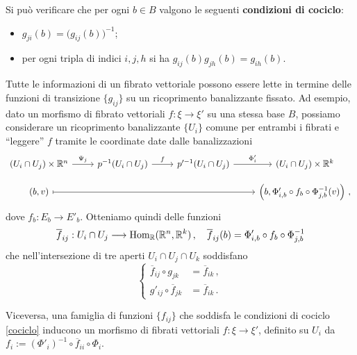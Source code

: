\begin{oss}
	Si può verificare che per ogni $b \in B$
	valgono le seguenti \textbf{condizioni di cociclo}:
	\begin{itemize}
		\item $g_{ji}(b) = \big( g_{ij}(b) \big)^{-1}$;
		\item per ogni tripla di indici $i,j,h$ si ha $g_{ij}(b) g_{jh}(b) = g_{ih}(b)$. 
	\end{itemize}
	Tutte le informazioni di un fibrato vettoriale possono essere 
	lette in termine delle funzioni di transizione $\{g_{ij}\}$ su
	un ricoprimento banalizzante fissato. Ad esempio,
	dato un morfismo di fibrato vettoriali $f: \xi \to \xi'$ su una stessa base $B$,
	possiamo considerare un ricoprimento banalizzante $\{U_{i}\}$ comune
	per entrambi i fibrati e ``leggere'' $f$ tramite le coordinate
	date dalle banalizzazioni
	\begin{equation*}
		\begin{tikzcd}[row sep=small]
			(U_{i} \cap U_{j}) \times \R^n  \ar[r, "\Psi_{j}"]
            & p^{-1}(U_{i} \cap U_{j}) \ar[r, "f"]
            & p'^{-1}(U_{i} \cap U_{j}) \ar[r, "\Phi_{i}'"]
            & (U_{i} \cap U_{j}) \times \R^k \\
            (b,v) \ar[rrr, mapsto]
            & & & \left(b, \Phi'_{i,b} \circ f_{b} \circ \Phi_{j,b}^{-1} (v) \right)\,,
		\end{tikzcd}
	\end{equation*}
	dove $f_{b} : E_{b} \to E'_{b}$. Otteniamo quindi delle funzioni
	\begin{equation*}
		\overline{f}_{ij} : U_{i} \cap U_{j} \longrightarrow \operatorname{Hom}_{{\mathbb R}}({\mathbb R}^{n},{\mathbb R}^{k})\,,
		\quad \overline{f}_{ij}(b) = \Phi'_{i,b} \circ f_{b} \circ \Phi_{j,b}^{-1}
	\end{equation*}
	che nell'intersezione di tre aperti $U_{i} \cap U_{j} \cap U_{k}$ soddisfano
	\begin{equation}\label{cociclo}
		\begin{cases}
			\overline{f}_{ij} \circ g_{jk} &= \overline{f}_{ik}\,, \\
			g'_{ij} \circ \overline{f}_{jk} &= \overline{f}_{ik}\,.
		\end{cases}
	\end{equation}

	Viceversa, una famiglia di funzioni $ \{ f_{ij} \} $ che soddisfa
	le condizioni di cociclo \eqref{cociclo} inducono
	un morfismo di fibrati vettoriali $f : \xi \to \xi'$,
	definito su $U_{i}$ da $f_{i} := (\Phi'_{i})^{-1} \circ \overline{f}_{ii} \circ \Phi_{i}$.
\end{oss}

